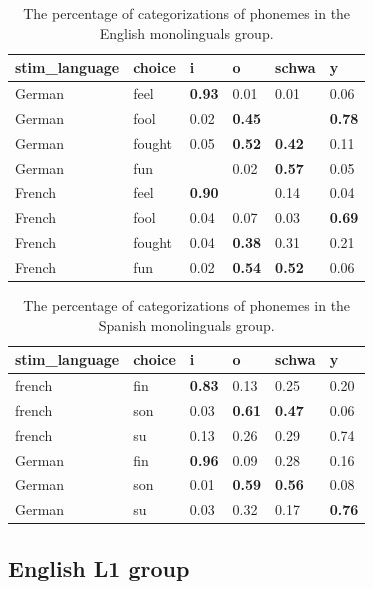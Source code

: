\documentclass[preprints]{Definitions/mdpi}
\begin{document}
\begin{table}[H] 
\caption{The percentage of categorizations of phonemes in the English monolinguals group.\label{el1_fr}}
\begin{tabularx}{\textwidth}{CCCCCC}
\toprule
stim\_language & choice & i & o & schwa & y \\ 
  \hline
German & feel & \textbf{0.93} & 0.01 & 0.01 & 0.06 \\ 
German & fool & 0.02 & \textbf{0.45} &  & \textbf{0.78} \\ 
German & fought & 0.05 & \textbf{0.52} & \textbf{0.42} & 0.11 \\ 
German & fun &  & 0.02 & \textbf{0.57} & 0.05 \\ 
French & feel & \textbf{0.90} &  & 0.14 & 0.04 \\ 
French & fool & 0.04 & 0.07 & 0.03 & \textbf{0.69} \\ 
French & fought & 0.04 & \textbf{0.38} & 0.31 & 0.21 \\ 
French & fun & 0.02 & \textbf{0.54} & \textbf{0.52} & 0.06 \\ 
\bottomrule
\end{tabularx}
\end{table}
\unskip

\begin{table}[H] 
\caption{The percentage of categorizations of phonemes in the Spanish monolinguals group.\label{el1_fr}}
\begin{tabularx}{\textwidth}{CCCCCC}
\toprule
stim\_language & choice & i & o & schwa & y \\ 
  \hline
french & fin & \textbf{0.83} & 0.13 & 0.25 & 0.20 \\ 
french & son & 0.03 & \textbf{0.61} & \textbf{0.47} & 0.06 \\ 
french & su & 0.13 & 0.26 & 0.29 & 0.74 \\ 
German & fin & \textbf{0.96} & 0.09 & 0.28 & 0.16 \\ 
German & son & 0.01 & \textbf{0.59} & \textbf{0.56} & 0.08 \\ 
German & su & 0.03 & 0.32 & 0.17 & \textbf{0.76} \\  
  
\bottomrule
\end{tabularx}
\end{table}
\unskip

\hypertarget{english-l1-group}{%
\subsection{English L1 group}\label{english-l1-group}}
\end{document}

